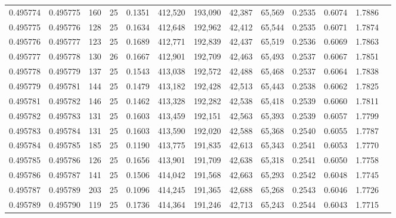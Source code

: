 \begin{tabular}{rrrrrrrrrrrrr}
0.495774 & 0.495775 &   160 &  25 &                                     0.1351 & 412,520 & 193,090 &  42,387 &  65,569 & 0.2535 & 0.6074 & 1.7886 \\
0.495775 & 0.495776 &   128 &  25 &                                     0.1634 & 412,648 & 192,962 &  42,412 &  65,544 & 0.2535 & 0.6071 & 1.7874 \\
0.495776 & 0.495777 &   123 &  25 &                                     0.1689 & 412,771 & 192,839 &  42,437 &  65,519 & 0.2536 & 0.6069 & 1.7863 \\
0.495777 & 0.495778 &   130 &  26 &                                     0.1667 & 412,901 & 192,709 &  42,463 &  65,493 & 0.2537 & 0.6067 & 1.7851 \\
0.495778 & 0.495779 &   137 &  25 &                                     0.1543 & 413,038 & 192,572 &  42,488 &  65,468 & 0.2537 & 0.6064 & 1.7838 \\
0.495779 & 0.495781 &   144 &  25 &                                     0.1479 & 413,182 & 192,428 &  42,513 &  65,443 & 0.2538 & 0.6062 & 1.7825 \\
0.495781 & 0.495782 &   146 &  25 &                                     0.1462 & 413,328 & 192,282 &  42,538 &  65,418 & 0.2539 & 0.6060 & 1.7811 \\
0.495782 & 0.495783 &   131 &  25 &                                     0.1603 & 413,459 & 192,151 &  42,563 &  65,393 & 0.2539 & 0.6057 & 1.7799 \\
0.495783 & 0.495784 &   131 &  25 &                                     0.1603 & 413,590 & 192,020 &  42,588 &  65,368 & 0.2540 & 0.6055 & 1.7787 \\
0.495784 & 0.495785 &   185 &  25 &                                     0.1190 & 413,775 & 191,835 &  42,613 &  65,343 & 0.2541 & 0.6053 & 1.7770 \\
0.495785 & 0.495786 &   126 &  25 &                                     0.1656 & 413,901 & 191,709 &  42,638 &  65,318 & 0.2541 & 0.6050 & 1.7758 \\
0.495786 & 0.495787 &   141 &  25 &                                     0.1506 & 414,042 & 191,568 &  42,663 &  65,293 & 0.2542 & 0.6048 & 1.7745 \\
0.495787 & 0.495789 &   203 &  25 &                                     0.1096 & 414,245 & 191,365 &  42,688 &  65,268 & 0.2543 & 0.6046 & 1.7726 \\
0.495789 & 0.495790 &   119 &  25 &                                     0.1736 & 414,364 & 191,246 &  42,713 &  65,243 & 0.2544 & 0.6043 & 1.7715 \\

\end{tabular}

